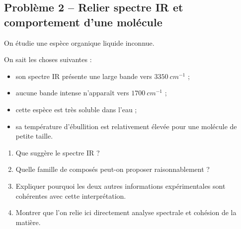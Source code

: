 \documentclass[11pt,a4paper]{article}
\begin{document}
\subsection{Problème 2 -- Relier spectre IR et comportement d'une molécule}

\begin{enoncebox}
On étudie une espèce organique liquide inconnue.

On sait les choses suivantes :
\begin{itemize}
    \item son spectre IR présente une large bande vers \(3350\ \si{cm^{-1}}\) ;
    \item aucune bande intense n'apparaît vers \(1700\ \si{cm^{-1}}\) ;
    \item cette espèce est très soluble dans l'eau ;
    \item sa température d'ébullition est relativement élevée pour une molécule de petite taille.
\end{itemize}

\begin{enumerate}[label=\arabic*)]
    \item Que suggère le spectre IR ?
    \item Quelle famille de composés peut-on proposer raisonnablement ?
    \item Expliquer pourquoi les deux autres informations expérimentales sont cohérentes avec cette interprétation.
    \item Montrer que l'on relie ici directement analyse spectrale et cohésion de la matière.
\end{enumerate}
\end{enoncebox}
\end{document}
